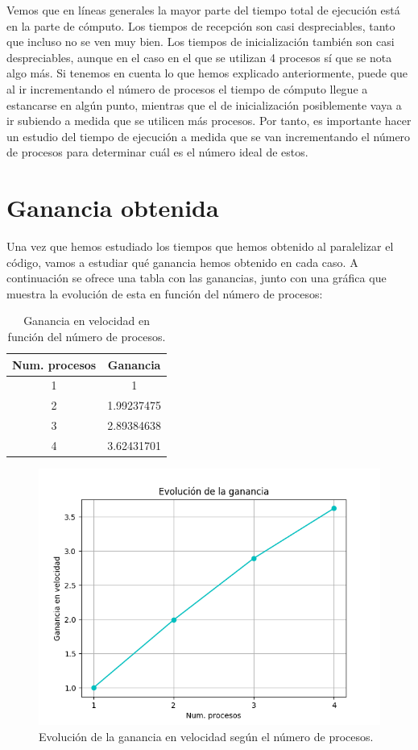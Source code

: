 \documentclass[11pt,a4paper]{article}
\begin{document}
Vemos que en líneas generales la mayor parte del tiempo total de ejecución está en la parte de
cómputo. Los tiempos de recepción son casi despreciables, tanto que incluso no se ven muy bien.
Los tiempos de inicialización también son casi despreciables, aunque en el caso en el que se
utilizan 4 procesos sí que se nota algo más. Si tenemos en cuenta lo que hemos explicado
anteriormente, puede que al ir incrementando el número de procesos el tiempo de cómputo
llegue a estancarse en algún punto, mientras que el de inicialización posiblemente vaya
a ir subiendo a medida que se utilicen más procesos. Por tanto, es importante hacer un estudio
del tiempo de ejecución a medida que se van incrementando el número de procesos para determinar
cuál es el número ideal de estos.

\section{Ganancia obtenida}

Una vez que hemos estudiado los tiempos que hemos obtenido al paralelizar el código, vamos
a estudiar qué ganancia hemos obtenido en cada caso. A continuación se ofrece una tabla
con las ganancias, junto con una gráfica que muestra la evolución de esta en función del
número de procesos:

\begin{table}[H]
\centering
\begin{tabular}{|c|c|}
\hline
\textbf{Num. procesos} & \textbf{Ganancia} \\ \hline
1 & 1 \\ \hline
2 & 1.99237475 \\ \hline
3 & 2.89384638 \\ \hline
4 & 3.62431701 \\ \hline
\end{tabular}
\caption{Ganancia en velocidad en función del número de procesos.}
\label{tab:my-table2}
\end{table}

\begin{figure}[H]
  \centering
  \includegraphics[scale=0.5]{img/ganancia}
  \caption{Evolución de la ganancia en velocidad según el número de procesos.}
  \label{fig:ganancia}
\end{figure}
\end{document}
